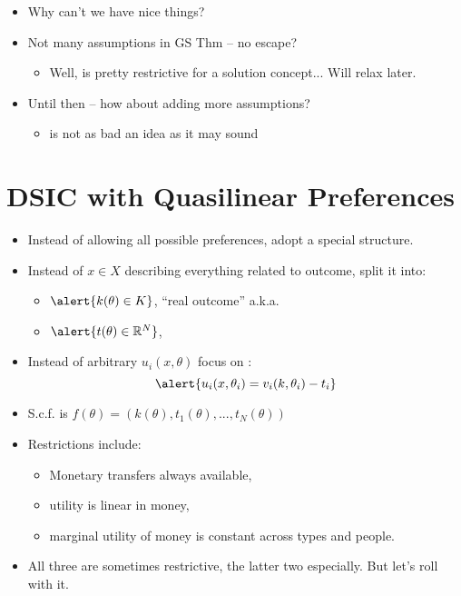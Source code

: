 \documentclass[english,handout]{beamer}		%
\def\lyxframeend{} %
\begin{document}
\begin{itemize}
	\item Why can't we have nice things?
	\item Not many assumptions in GS Thm -- no escape?
	\pause
	\begin{itemize}
		\item Well,  is pretty restrictive for a solution concept... Will relax later.
	\end{itemize}
	\item Until then -- how about adding more assumptions?
	\begin{itemize}
		\item {} is not as bad an idea as it may sound
	\end{itemize}
\end{itemize}
\lyxframeend





\section{DSIC with Quasilinear Preferences}


\begin{itemize}
	\item Instead of allowing all possible preferences, adopt a special structure.
	\item Instead of $x \in X$ describing everything related to outcome, split it into:
	\begin{itemize}
		\item $\alert{k(\theta) \in K}$, ``real outcome'' a.k.a. 
		\item $\alert{t(\theta) \in \mathbb{R}^N}$, 
	\end{itemize}
	\item Instead of arbitrary $u_i(x,\theta)$ focus on :
	$$\alert{ u_i(x,\theta_i) = v_i(k,\theta_i) - t_i }$$
	\pause\vspace{-1em}
	\item S.c.f. is $f(\theta) = \left( k(\theta), t_1(\theta), ..., t_N(\theta) \right)$
\end{itemize}
\vspace{-2em}
\lyxframeend


\begin{itemize}
	\item Restrictions include:
	\begin{itemize}
		\item Monetary transfers always available,
		\item utility is linear in money,
		\item marginal utility of money is constant across types and people.
	\end{itemize}
	\item All three are sometimes restrictive, the latter two especially. But let's roll with it.
\end{itemize}
\lyxframeend
\end{document}
